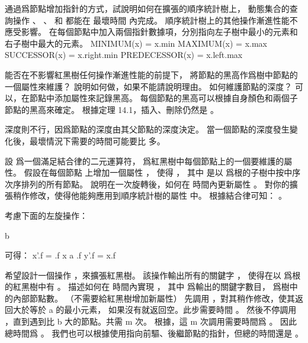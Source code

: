 \startsection[
  title={How to augment a data structure},
]

通過爲節點增加指針的方式，試說明如何在擴張的順序統計樹上，
動態集合的查詢操作 、 、  和  都能在
最壞時間  內完成。
順序統計樹上的其他操作漸進性能不應受影響。
\stopEXERCISE
\startANSWER
在每個節點中加入兩個指針數據項，分別指向左子樹中最小的元素和右子樹中最大的元素。
\startformula\startmathalignment
\NC MINIMUM(x) \NC = x.min\NR
\NC MAXIMUM(x) \NC = x.max\NR
\NC SUCCESSOR(x) \NC = x.right.min\NR
\NC PREDECESSOR(x) \NC = x.left.max\NR
\stopmathalignment\stopformula
\stopANSWER

\startEXERCISE
能否在不影響紅黑樹任何操作漸進性能的前提下，
將節點的黑高作爲樹中節點的一個屬性來維護？
說明如何做，如果不能請說明理由。
如何維護節點的深度？
\stopEXERCISE
\startANSWER
可以，在節點中添加屬性來記錄黑高。
每個節點的黑高可以根據自身顏色和兩個子節點的黑高來確定。
根據定理 14.1，插入、刪除仍然是 。

深度則不行，因爲節點的深度由其父節點的深度決定。
當一個節點的深度發生變化後，最壞情況下需要的時間可能要比  多。
\stopANSWER

\startEXERCISE
設 \m{\otimes} 爲一個滿足結合律的二元運算符，
  爲紅黑樹中每個節點上的一個要維護的屬性。
假設在每個節點  上增加一個屬性 ，
使得 ，
其中  是以  爲根的子樹中按中序次序排列的所有節點。
說明在一次旋轉後，如何在  時間內更新屬性 。
對你的擴張稍作修改，使得他能夠應用到順序統計樹的屬性  中。
\stopEXERCISE
\startANSWER
根據結合律可知： 。

考慮下面的左旋操作：

{\externalfigure[output/e14_2_3-2]}{b}
\stopcombination

可得：
\startformula\startmathalignment
\NC x'.f \NC = \alpha.f \otimes x \cdot a \otimes \beta.f \NR
\NC y'.f \NC = x.f \NR
\stopmathalignment\stopformula
\stopANSWER

\startEXERCISE
希望設計一個操作 ，來擴張紅黑樹。
該操作輸出所有的關鍵字 ，
使得在以  爲根的紅黑樹中有 。
描述如何在  時間內實現 ，
其中  爲輸出的關鍵字數目，
  爲樹中的內部節點數。
（\hint 不需要給紅黑樹增加新屬性）
\stopEXERCISE
\startANSWER
先調用 ，對其稍作修改，使其返回大於等於 a 的最小元素，
如果沒有就返回空。此步需要時間 。
然後不停調用 ，直到遇到比 b 大的節點。共需 m 次。
根據，這 m 次調用需要時間爲 。
因此總時間爲 。
我們也可以根據 使用指向前驅、後繼節點的指針，但總的時間還是 。
\stopANSWER

\stopsection
